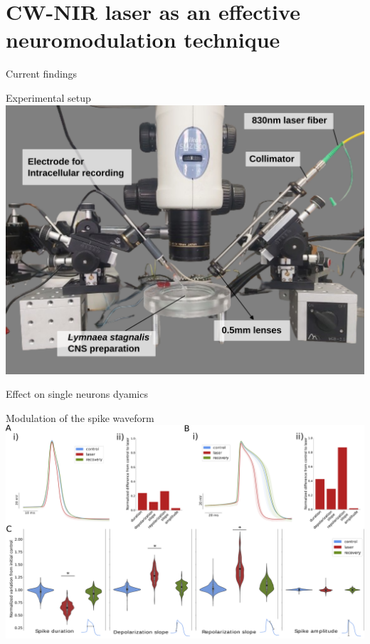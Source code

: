 \documentclass[aspectratio=43]{beamer}
\begin{document}
\section[CW-NIR Neuromodulation]{CW-NIR laser as an effective neuromodulation technique}
\begin{frame}{Current findings}
\end{frame}
\begin{frame}{Experimental setup}
	\includegraphics[width=\textwidth]{methods/laser-setup_labels.png}
\end{frame}


\begin{frame}{Effect on single neurons dyamics}
\end{frame}


\begin{frame}{Modulation of the spike waveform}
	\includegraphics[width=\textwidth]{laser/Figure2.png}
\end{frame}
\end{document}
